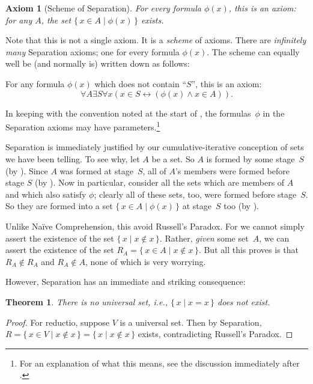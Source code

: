 \documentclass[10pt,a4paper]{article}
\makeatletter
\theoremstyle{plain}
\newtheorem{thm}{Theorem}[section]
\newtheorem{axiom}{Axiom}
\theoremstyle{definition}
\theoremstyle{remark}
\newcommand*{\ollabel}[1]{\label{#1}}
\newcommand{\olref}{\@ifnextchar[{\olref@i}{\olref@final}}
\def\olref@i[#1]{\@ifnextchar[{\olref@ii}{\olref@final}}
\def\olref@ii[#1]{\@ifnextchar[{\olref@iii}{\olref@final}}
\def\olref@iii[#1]{\olref@final}
\def\olref@final#1{\ref{#1}}
\providecommand{\Setabs}[2]{\{\, #1 \mid #2 \,\}}
\providecommand{\liff}{\mathbin{\leftrightarrow}}
\makeatother
\begin{document}
\begin{axiom}[Scheme of Separation] For every formula $\phi(x)$, this is an
axiom: for any $A$, the set $\Setabs{x \in A}{\phi(x)}$ exists.
\end{axiom}

Note that this is not a single axiom. It is a \emph{scheme} of axioms.
There are \emph{infinitely many} Separation axioms; one for every
formula $\phi(x)$. The scheme can equally well be (and normally is)
written down as follows:

\begin{defish}
For any formula $\phi(x)$ which does not contain ``$S$'', this is an
axiom:
\[
	\forall A \exists S \forall x(x \in S \liff (\phi(x) \land x \in A)).
\]
\end{defish}

In keeping with the convention noted at the start of
\olref[sth][][]{part}, the formulas~$\phi$ in the Separation axioms
may have parameters.\footnote{For an explanation of what this means,
see the discussion immediately after
\olref[sfr][infinite][induction]{natinductionschema}.}

Separation is immediately justified by our cumulative-iterative
conception of sets we have been telling. To see why, let $A$ be a set.
So $A$ is formed by some stage~$S$ (by \stageshier). Since $A$ was
formed at stage~$S$, all of $A$'s members were formed before stage $S$
(by \stagesacc). Now in particular, consider all the sets which are
members of $A$ and which also satisfy $\phi$; clearly all of these
sets, too, were formed before stage~$S$. So they are formed into a set
$\Setabs{x \in A}{\phi(x)}$ at stage~$S$ too (by \stagesacc).

Unlike Na\"ive Comprehension, this avoid Russell's Paradox. For we
cannot simply assert the existence of the set $\Setabs{x}{x \notin
x}$. Rather, \emph{given} some set~$A$, we can assert the existence of
the set $R_A = \Setabs{x \in A}{x \notin x}$. But all this proves is
that $R_A \notin R_A$ and $R_A \notin A$, none of which is very
worrying.

However, Separation has an immediate and striking consequence:

\begin{thm}\ollabel{thm:NoUniversalSet}
There is no \emph{universal} set, i.e., $\Setabs{x}{x = x}$ does not exist.
\end{thm}

\begin{proof}
For reductio, suppose $V$ is a universal set. Then by Separation, $R =
\Setabs{x \in V}{x \notin x} = \Setabs{x}{x \notin x}$ exists,
contradicting Russell's Paradox.
\end{proof}
\end{document}
